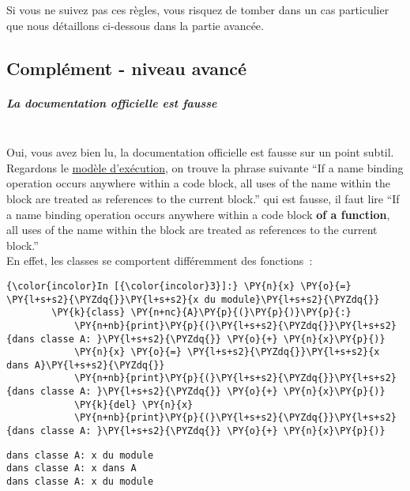 Si vous ne suivez pas ces règles, vous risquez de tomber dans un cas
particulier que nous détaillons ci-dessous dans la partie avancée.

    \hypertarget{compluxe9ment---niveau-avancuxe9}{%
\subsection{Complément - niveau
avancé}\label{compluxe9ment---niveau-avancuxe9}}

    \hypertarget{la-documentation-officielle-est-fausse}{%
\subparagraph{La documentation officielle est
fausse\\\\}\label{la-documentation-officielle-est-fausse}}

    Oui, vous avez bien lu, la documentation officielle est fausse sur un
point subtil. Regardons le
\href{https://docs.python.org/3/reference/executionmodel.html}{modèle
d'exécution}, on trouve la phrase suivante ``If a name binding operation
occurs anywhere within a code block, all uses of the name within the
block are treated as references to the current block.'' qui est fausse,
il faut lire ``If a name binding operation occurs anywhere within a code
block \textbf{of a function}, all uses of the name within the block are
treated as references to the current block.''\\

En effet, les classes se comportent différemment des fonctions~:

    \begin{Verbatim}[commandchars=\\\{\}]
{\color{incolor}In [{\color{incolor}3}]:} \PY{n}{x} \PY{o}{=} \PY{l+s+s2}{\PYZdq{}}\PY{l+s+s2}{x du module}\PY{l+s+s2}{\PYZdq{}}
        \PY{k}{class} \PY{n+nc}{A}\PY{p}{(}\PY{p}{)}\PY{p}{:}
            \PY{n+nb}{print}\PY{p}{(}\PY{l+s+s2}{\PYZdq{}}\PY{l+s+s2}{dans classe A: }\PY{l+s+s2}{\PYZdq{}} \PY{o}{+} \PY{n}{x}\PY{p}{)}
            \PY{n}{x} \PY{o}{=} \PY{l+s+s2}{\PYZdq{}}\PY{l+s+s2}{x dans A}\PY{l+s+s2}{\PYZdq{}}
            \PY{n+nb}{print}\PY{p}{(}\PY{l+s+s2}{\PYZdq{}}\PY{l+s+s2}{dans classe A: }\PY{l+s+s2}{\PYZdq{}} \PY{o}{+} \PY{n}{x}\PY{p}{)}
            \PY{k}{del} \PY{n}{x}
            \PY{n+nb}{print}\PY{p}{(}\PY{l+s+s2}{\PYZdq{}}\PY{l+s+s2}{dans classe A: }\PY{l+s+s2}{\PYZdq{}} \PY{o}{+} \PY{n}{x}\PY{p}{)}
\end{Verbatim}


    \begin{Verbatim}[commandchars=\\\{\}]
dans classe A: x du module
dans classe A: x dans A
dans classe A: x du module

    \end{Verbatim}


